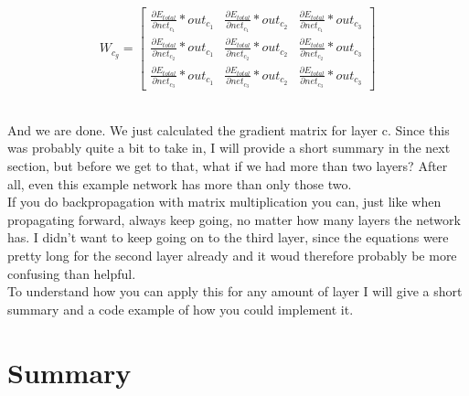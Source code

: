 \documentclass[11pt, halfparskip]{article}
\begin{document}
    \[
    	W_{c_g} = 
    	\begin{bmatrix}
    		\frac{\partial E_{total}}{\partial net_{c_1}} * out_{c_1} & \frac{\partial E_{total}}{\partial net_{c_1}} * out_{c_2}
    		& \frac{\partial E_{total}}{\partial net_{c_1}} * out_{c_3}\\
    		\frac{\partial E_{total}}{\partial net_{c_2}} * out_{c_1} & \frac{\partial E_{total}}{\partial net_{c_2}} * out_{c_2}
    		& \frac{\partial E_{total}}{\partial net_{c_2}} * out_{c_3}\\
    		\frac{\partial E_{total}}{\partial net_{c_3}} * out_{c_1} & \frac{\partial E_{total}}{\partial net_{c_3}} * out_{c_2}
    		& \frac{\partial E_{total}}{\partial net_{c_3}} * out_{c_3}
    	\end{bmatrix}
    \]
    
    \noindent \\
    And we are done. We just calculated the gradient matrix for layer c. Since this was probably quite a bit to take in, I will provide a short summary in the next section, but before we
    get to that, what if we had more than two layers? After all, even this example network has more than only those two.\\
    If you do backpropagation with matrix multiplication you can, just like when propagating forward, always keep going, no matter how many layers the network has. I didn't want to
    keep going on to the third layer, since the equations were pretty long for the second layer already and it woud therefore probably be more confusing than helpful.\\
    To understand how you can apply this for any amount of layer I will give a short summary and a code example of how you could implement it.
    
    \newpage
    \section{Summary}
    \label{sec:summary}
    \noindent
\end{document}

